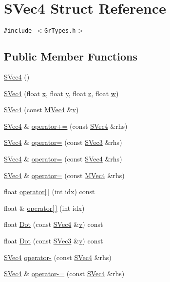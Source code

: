 \hypertarget{struct_s_vec4}{
\section{SVec4 Struct Reference}
\label{struct_s_vec4}
}
{\tt \#include $<$GrTypes.h$>$}

\subsection*{Public Member Functions}
\begin{CompactItemize}
\item 
\hyperlink{struct_s_vec4_9b832ac71d33777098927b20ebaa9f19}{SVec4} ()
\item 
\hyperlink{struct_s_vec4_1cddd253869141aba1d18c16ddfebddd}{SVec4} (float \hyperlink{struct_s_vec4_b0b56171d97e8391eb5b139d7a97ca78}{x}, float \hyperlink{struct_s_vec4_14d72d33532154a5b90006e4bbe7d84a}{y}, float \hyperlink{struct_s_vec4_2391d03d7326ea13c075cf5e8de71c4f}{z}, float \hyperlink{struct_s_vec4_27c9c543518d87d4e7f0ace5487352d7}{w})
\item 
\hyperlink{struct_s_vec4_ee214f138cc9b1d2b15b2c7ddbf4ffad}{SVec4} (const \hyperlink{class_m_vec4}{MVec4} \&\hyperlink{glext__bak_8h_5cf89b94f7478c0ebc4429b60e7ef93b}{v})
\item 
\hyperlink{struct_s_vec4}{SVec4} \& \hyperlink{struct_s_vec4_a9fbbae509431eded36093a211311fcd}{operator+=} (const \hyperlink{struct_s_vec4}{SVec4} \&rhs)
\item 
\hyperlink{struct_s_vec4}{SVec4} \& \hyperlink{struct_s_vec4_7d79784e22140bfa5730ed822ec48828}{operator=} (const \hyperlink{struct_s_vec3}{SVec3} \&rhs)
\item 
\hyperlink{struct_s_vec4}{SVec4} \& \hyperlink{struct_s_vec4_7fa30a8577fcfdf823384fd394002a62}{operator=} (const \hyperlink{struct_s_vec4}{SVec4} \&rhs)
\item 
\hyperlink{struct_s_vec4}{SVec4} \& \hyperlink{struct_s_vec4_1c00e84244ce1734a291a4f314b7eea5}{operator=} (const \hyperlink{class_m_vec4}{MVec4} \&rhs)
\item 
float \hyperlink{struct_s_vec4_d565153f964a379147ae31aa8dfcde5b}{operator\mbox{[}$\,$\mbox{]}} (int idx) const 
\item 
float \& \hyperlink{struct_s_vec4_3d663590290a7baca7adade6ff5c040c}{operator\mbox{[}$\,$\mbox{]}} (int idx)
\item 
float \hyperlink{struct_s_vec4_f27625f868b06288cf93eba125dff64c}{Dot} (const \hyperlink{struct_s_vec4}{SVec4} \&\hyperlink{glext__bak_8h_5cf89b94f7478c0ebc4429b60e7ef93b}{v}) const 
\item 
float \hyperlink{struct_s_vec4_26a0c27e2e6586043ea9a04d16e5fe56}{Dot} (const \hyperlink{struct_s_vec3}{SVec3} \&\hyperlink{glext__bak_8h_5cf89b94f7478c0ebc4429b60e7ef93b}{v}) const 
\item 
\hyperlink{struct_s_vec4}{SVec4} \hyperlink{struct_s_vec4_a0fb27aaa9db6c0ad3fd313c7d1f8832}{operator-} (const \hyperlink{struct_s_vec4}{SVec4} \&rhs)
\item 
\hyperlink{struct_s_vec4}{SVec4} \& \hyperlink{struct_s_vec4_58f5761ebfb64b825c6b19e5f860261b}{operator-=} (const \hyperlink{struct_s_vec4}{SVec4} \&rhs)
\end{CompactItemize}
